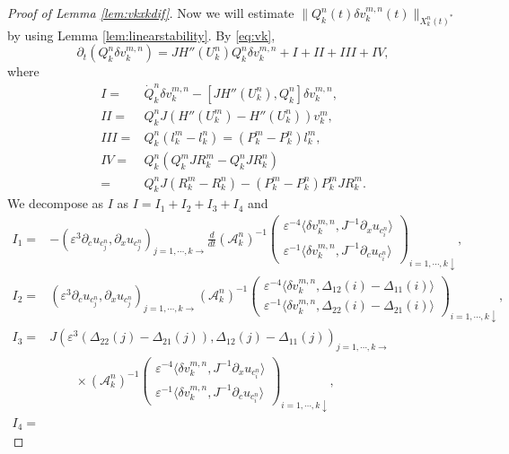 \documentclass[11pt]{amsart}
\theoremstyle{remark}
\numberwithin{equation}{section}
\begin{document}
\begin{proof}[Proof of Lemma \ref{lem:vkxkdif}]
Now we will estimate $\|Q_k^n(t){\delta v}_k^{m,n}(t)\|_{X_k^n(t)^*}$ by using
Lemma \ref{lem:linearstability}.
By \eqref{eq:vk},
\begin{equation}
  \label{eq:qdifv}
  {\partial}_t(Q_k^n{\delta v}_k^{m,n})=JH''(U_k^n)Q_k^n{\delta v}_k^{m,n}+I+II+III+IV,
\end{equation}
where
\begin{align*}
I=& \dot{Q}_k^n{\delta v}_k^{m,n}-[JH''(U_k^n),Q_k^n]{\delta v}_k^{m,n},\\
II=& Q_k^nJ(H''(U_k^m)-H''(U_k^n))v_k^m,\\
III=& Q_k^n(l_k^m-l_k^n)=(P_k^m-P_k^n)l_k^m,\\
IV=& Q_k^n(Q_k^mJR_k^m-Q_k^nJR_k^n)
\\=& Q_k^nJ(R_k^m-R_k^n)-(P_k^m-P_k^n)P_k^mJR_k^m.
\end{align*}
We decompose as $I$ as $I=I_1+I_2+I_3+I_4$ and
\begin{align*}
I_1=& -({\varepsilon}^3{\partial}_cu_{c_j^n},{\partial}_xu_{c_j^n})_{j=1,\cdots,k\rightarrow}
\frac{d}{dt}(\mathcal{A}_k^n)^{-1}
\begin{pmatrix}
{\varepsilon}^{-4}{\langle} {\delta v}_k^{m,n},J^{-1}{\partial}_xu_{c_i^n}{\rangle} \\
{\varepsilon}^{-1}{\langle} {\delta v}_k^{m,n},J^{-1}{\partial}_cu_{c_i^n}{\rangle}
\end{pmatrix}_{i=1,\cdots,k \downarrow},
\\ I_2=&
({\varepsilon}^3{\partial}_cu_{c_j^n},{\partial}_xu_{c_j^n})_{j=1,\cdots,k\rightarrow}
(\mathcal{A}_k^n)^{-1} 
\begin{pmatrix} 
{\varepsilon}^{-4}{\langle} {\delta v}_k^{m,n}, \Delta_{12}(i)-\Delta_{11}(i) {\rangle}
 \\ {\varepsilon}^{-1}{\langle} {\delta v}_k^{m,n}, \Delta_{22}(i)-\Delta_{21}(i) {\rangle}
\end{pmatrix}_{i=1,\cdots,k \downarrow},
\\ I_3=&
J({\varepsilon}^3(\Delta_{22}(j)-\Delta_{21}(j)),
\Delta_{12}(j)-\Delta_{11}(j))_{j=1,\cdots,k\rightarrow}\\
& \qquad \times
(\mathcal{A}_k^n)^{-1} 
\begin{pmatrix}
{\varepsilon}^{-4}{\langle} {\delta v}_k^{m,n},J^{-1}{\partial}_xu_{c_i^n}{\rangle} \\
{\varepsilon}^{-1}{\langle} {\delta v}_k^{m,n},J^{-1}{\partial}_cu_{c_i^n}{\rangle}
\end{pmatrix}_{i=1,\cdots,k \downarrow},
\\ I_4=&

\end{align*}
\end{proof}
\end{document}
